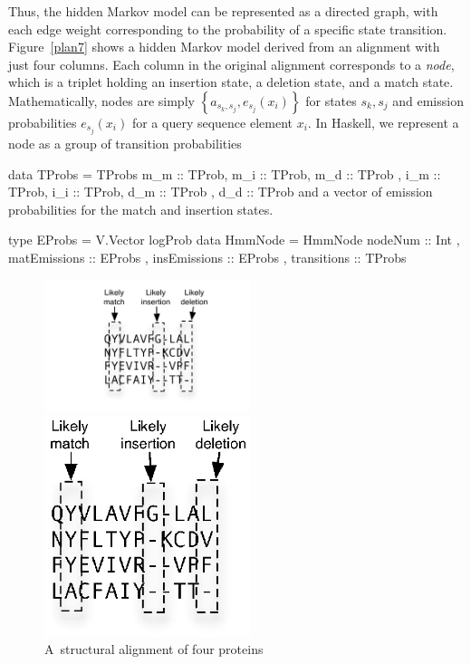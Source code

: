 \documentclass[preprint,nonatbib,blockstyle,nocopyrightspace,times]{sigplanconf}
\newcommand\figref[1]{Figure~\ref{#1}}
\newenvironment{smallverbatim}{\par\small\verbatim}{\endverbatim}
\begin{document}
Thus, the hidden Markov model can be represented as a directed graph, with each
edge weight corresponding to the probability of a specific state transition.
\figref{plan7} shows a hidden Markov model derived from an alignment
with just four columns.
Each column in the original alignment corresponds to a \emph{node},
which is a triplet holding an insertion state, a deletion state, and a
match state.
Mathematically, nodes are simply $\left\{a_{s_{k},s_{j}}, e_{s_{j}}(x_{i})\right\}$
for states $s_{k}, s_{j}$ and emission probabilities $e_{s_{j}}(x_{i})$ for a
query sequence element $x_{i}$.
In Haskell, we represent a node as a group of transition probabilities
\begin{smallverbatim}
data TProbs = 
     TProbs { m_m :: TProb, m_i :: TProb, m_d :: TProb
            , i_m :: TProb, i_i :: TProb, d_m :: TProb
            , d_d :: TProb}
\end{smallverbatim}
and a vector of emission probabilities for the match and insertion states.
\begin{smallverbatim}
type EProbs = V.Vector logProb
data HmmNode = HmmNode { nodeNum :: Int
                       , matEmissions :: EProbs
                       , insEmissions :: EProbs
                       , transitions :: TProbs
                       }
\end{smallverbatim}

\begin{figure}
\ifpdfmadness
\centerline{\includegraphics[width=6cm]{alignment.pdf}} 
\else
\centerline{\includegraphics[width=6cm]{alignment.eps}} 
\fi



\caption{A~structural alignment of four proteins}
\label{alignment} 
\end{figure}
\end{document}

